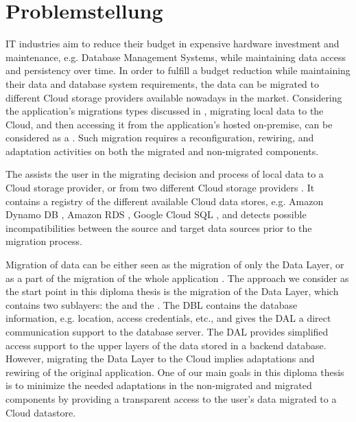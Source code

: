 \section{Problemstellung}
\label{sec:Problemstellung}

IT industries aim to reduce their budget in expensive hardware investment and maintenance, e.g. Database Management Systems, while maintaining data access and persistency over time. In order to fulfill a budget reduction while maintaining their data and database system requirements, the data can be migrated to different Cloud storage providers available nowadays in the market. Considering the application's migrations types discussed in \cite{andrikopoulos2013}, migrating local data to the Cloud, and then accessing it from the application's hosted on-premise, can be considered as a . Such migration requires a reconfiguration, rewiring, and adaptation activities on both the migrated and non-migrated components.

The  assists the user in the migrating decision and process of local data to a Cloud storage provider, or from two different Cloud storage providers \cite{bachmann2012}. It contains a registry of the different available Cloud data stores, e.g. Amazon Dynamo DB  \cite{amazondynamodb}, Amazon RDS \cite{amazonrds}, Google Cloud SQL \cite{googlecloudsql}, and detects possible incompatibilities between the source and target data sources prior to the migration process.

Migration of data can be either seen as the migration of only the Data Layer, or as a part of the migration of the whole application \cite{andrikopoulos2013}. The approach we consider as the start point in this diploma thesis is the migration of the Data Layer, which contains two sublayers: the  and the . The DBL contains the database information, e.g. location, access credentials, etc., and gives the DAL a direct communication support to the database server. The DAL provides simplified access support to the upper layers of the data stored in a backend database. However, migrating the Data Layer to the Cloud implies adaptations and rewiring of the original application. One of our main goals in this diploma thesis is to minimize the needed adaptations in the non-migrated and migrated components by providing a transparent access to the user's data migrated to a Cloud datastore. 


